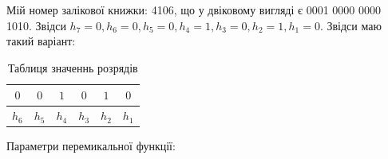 \documentclass[12pt,a4paper]{article}
\begin{document}
    Мій номер залікової книжки: 4106, що у двіковому вигляді є 0001 0000 0000 1010.
    Звідси $h_7 = 0, h_6 = 0, h_5 = 0, h_4 = 1, h_3 = 0, h_2 = 1, h_1 = 0$.
    Звідси маю такий варіант:

    \begin{table}[h]
        \centering
        \renewcommand{\arraystretch}{1.3}
        \begin{tabular}{|cccccc|}
        \hline
        $0$ & $0$ & $1$ & $0$ & $1$ & $0$ \\
        \hline
        $h_6$ & $h_5$ & $h_4$ & $h_3$ & $h_2$ & $h_1$ \\
        \hline
        \end{tabular}
        \caption{Таблиця значеннь розрядів}
    \end{table}

    \noindent
    Параметри перемикальної функції:
\end{document}
